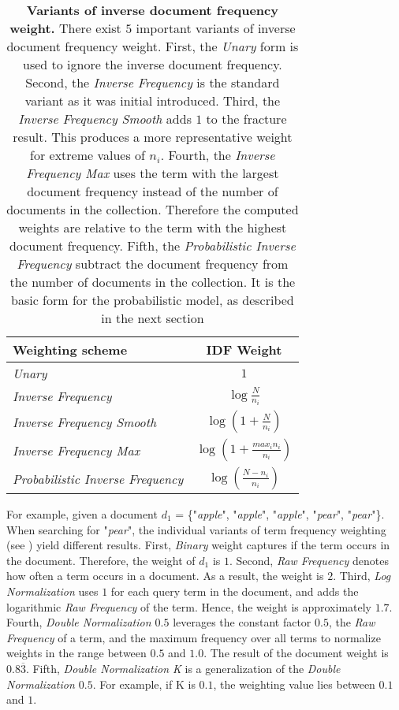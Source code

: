 \begin{table}[b!]
    \centering
    \begin{tabular}{ l c }
      \toprule
      \textbf{Weighting scheme} & \textbf{IDF Weight} \\ \midrule
      \textit{Unary}  & $1$  \\
      \textit{Inverse Frequency} & $\log \frac{N}{n_i}$  \\
      \textit{Inverse Frequency Smooth} & $\log (1 + \frac{N}{n_i})$  \\
      \textit{Inverse Frequency Max} & $\log (1 + \frac{max_i n_i}{n_i})$  \\
      \textit{Probabilistic Inverse Frequency} & $\log (\frac{N - n_i}{n_i})$  \\
      \bottomrule
    \end{tabular}
  \caption[Variants of inverse document frequency weight]{\textbf{Variants of inverse document frequency weight.} There exist $5$ important variants of inverse document frequency weight. First, the \textit{Unary} form is used to ignore the inverse document frequency. Second, the \textit{Inverse Frequency} is the standard variant as it was initial introduced. Third, the \textit{Inverse Frequency Smooth} adds $1$ to the fracture result. This produces a more representative weight for extreme values of $n_i$. Fourth, the \textit{Inverse Frequency Max} uses the term with the largest document frequency instead of the number of documents in the collection. Therefore the computed weights are relative to the term with the highest document frequency. Fifth, the \textit{Probabilistic Inverse Frequency} subtract the document frequency from the number of documents in the collection. It is the basic form for the probabilistic model, as described in the next section}
  \label{tbl:idf_variants}
\end{table}

For example, given a document $d_1$ = \{"\textit{apple}", "\textit{apple}", "\textit{apple}", "\textit{pear}", "\textit{pear}"\}. When searching for "\textit{pear}", the individual variants of term frequency weighting (see ) yield different results. First, \textit{Binary} weight captures if the term occurs in the document. Therefore, the weight of $d_1$ is $1$. Second, \textit{Raw Frequency} denotes how often a term occurs in a document. As a result, the weight is $2$. Third, \textit{Log Normalization} uses $1$ for each query term in the document, and adds the logarithmic \textit{Raw Frequency} of the term. Hence, the weight is approximately $1.7$. Fourth, \textit{Double Normalization $0.5$} leverages the constant factor $0.5$, the \textit{Raw Frequency} of a term, and the maximum frequency over all terms to normalize weights in the range between $0.5$ and $1.0$. The result of the document weight is $0.8\overline{3}$. Fifth, \textit{Double Normalization K} is a generalization of the \textit{Double Normalization $0.5$}. For example, if K is $0.1$, the weighting value lies between $0.1$ and $1$.

